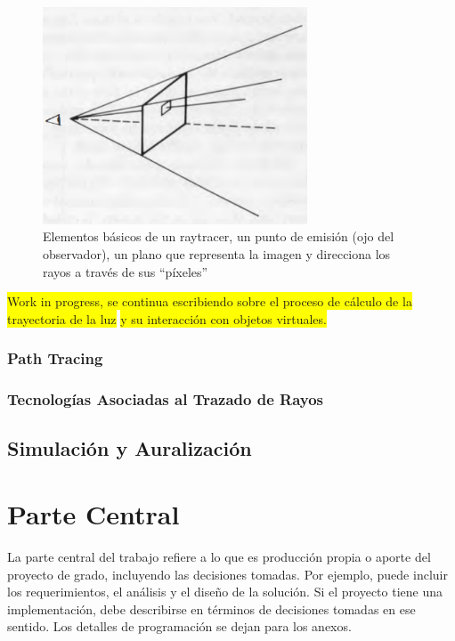 \documentclass{prgrado}
\begin{document}
\begin{figure}[h!]
    \centering
    \includegraphics[width=0.7\textwidth]{figs/simplified-raytracer.png}
    \captionsetup{justification=centering}
    \caption{Elementos básicos de un raytracer, un punto de emisión (ojo del observador), un plano que representa la imagen y direcciona los rayos a través de sus “píxeles”}
    \label{fig:raytracer}
\end{figure}

\colorbox{yellow}{Work in progress, se continua escribiendo sobre el proceso de cálculo de la trayectoria de la luz}\newline
\colorbox{yellow}{ y su interacción con objetos virtuales.}

\subsection{Path Tracing}

\subsection{Tecnologías Asociadas al Trazado de Rayos}

\section{Simulación y Auralización}

\chapter{Parte Central}
La parte central del trabajo refiere a lo que es producción propia o aporte del
proyecto de grado, incluyendo las decisiones tomadas. Por ejemplo, puede incluir
los requerimientos, el análisis y el diseño de la solución. Si el proyecto tiene una
implementación, debe describirse en términos de decisiones tomadas en ese sentido.
Los detalles de programación se dejan para los anexos.
\end{document}
